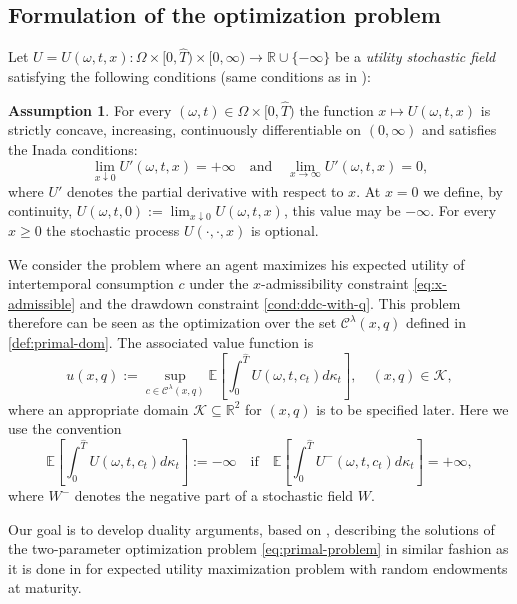 \documentclass[11pt, oneside]{article}   	%
\theoremstyle{plain}
\theoremstyle{definition}
\newtheorem{assume}[thm]{Assumption}
\theoremstyle{remark}
\begin{document}

\subsection{Formulation of the optimization problem}

Let $U=U(\omega,t,x):\Omega\times[0,\hat{T})\times[0,\infty)\to\mathbb{R}\cup\{-\infty\}$ be a \textit{utility stochastic field} satisfying the following conditions (same conditions as in \cite{mostovyi}):
\begin{assume}\label{ass:utility}
For every $(\omega,t)\in\Omega\times[0,\hat{T})$ the function $x\mapsto U(\omega,t,x)$ is strictly concave, increasing, continuously differentiable on $(0,\infty)$ and satisfies the Inada conditions:
$$\lim_{x\downarrow 0}U'(\omega,t,x)=+\infty\quad\text{and}\quad\lim_{x\to\infty}U'(\omega,t,x)=0,$$
where $U'$ denotes the partial derivative with respect to $x$. At $x=0$ we define, by continuity, $U(\omega,t,0):=\lim_{x\downarrow 0}U(\omega,t,x)$, this value may be $-\infty$. For every $x\geq 0$ the stochastic process $U(\cdot,\cdot,x)$ is optional.
\end{assume}

We consider the problem where an agent maximizes his expected utility of intertemporal consumption $c$ under the $x$-admissibility constraint \eqref{eq:x-admissible} and the drawdown constraint \eqref{cond:ddc-with-q}. This problem therefore can be seen as the optimization over the set $\mathcal{C}^\lambda(x,q)$ defined in \eqref{def:primal-dom}. The associated value function is
\begin{equation}\label{eq:primal-problem}
u(x,q):=\sup_{c\in\mathcal{C}^\lambda(x,q)}\mathbb{E}\left[\int_0^{\hat{T}} U(\omega,t,c_t)d\kappa_t\right],\quad (x,q)\in\mathcal{K},
\end{equation}
where an appropriate domain $\mathcal{K}\subseteq\mathbb{R}^2$ for $(x,q)$ is to be specified later.
Here we use the convention
$$\mathbb{E}\left[\int_0^{\hat{T}} U(\omega,t,c_t)d\kappa_t\right]:=-\infty\quad\text{if}\quad \mathbb{E}\left[\int_0^{\hat{T}} U^{-}(\omega,t,c_t)d\kappa_t\right]=+\infty,$$
where $W^{-}$ denotes the negative part of a stochastic field $W$.

Our goal is to develop duality arguments, based on \cite{mostovyi}, describing the solutions of the two-parameter optimization problem \eqref{eq:primal-problem} in similar fashion as it is done in \cite{hug-kramkov} for expected utility maximization problem with random endowments at maturity.
\end{document}
